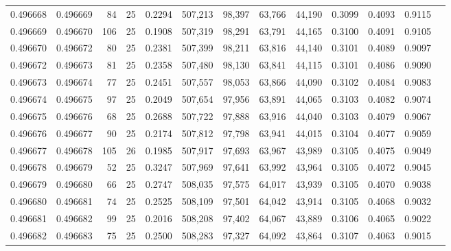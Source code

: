 \begin{tabular}{rrrrrrrrrrrrr}
0.496668 & 0.496669 &    84 &  25 &                                     0.2294 & 507,213 &  98,397 &  63,766 &  44,190 & 0.3099 & 0.4093 & 0.9115 \\
0.496669 & 0.496670 &   106 &  25 &                                     0.1908 & 507,319 &  98,291 &  63,791 &  44,165 & 0.3100 & 0.4091 & 0.9105 \\
0.496670 & 0.496672 &    80 &  25 &                                     0.2381 & 507,399 &  98,211 &  63,816 &  44,140 & 0.3101 & 0.4089 & 0.9097 \\
0.496672 & 0.496673 &    81 &  25 &                                     0.2358 & 507,480 &  98,130 &  63,841 &  44,115 & 0.3101 & 0.4086 & 0.9090 \\
0.496673 & 0.496674 &    77 &  25 &                                     0.2451 & 507,557 &  98,053 &  63,866 &  44,090 & 0.3102 & 0.4084 & 0.9083 \\
0.496674 & 0.496675 &    97 &  25 &                                     0.2049 & 507,654 &  97,956 &  63,891 &  44,065 & 0.3103 & 0.4082 & 0.9074 \\
0.496675 & 0.496676 &    68 &  25 &                                     0.2688 & 507,722 &  97,888 &  63,916 &  44,040 & 0.3103 & 0.4079 & 0.9067 \\
0.496676 & 0.496677 &    90 &  25 &                                     0.2174 & 507,812 &  97,798 &  63,941 &  44,015 & 0.3104 & 0.4077 & 0.9059 \\
0.496677 & 0.496678 &   105 &  26 &                                     0.1985 & 507,917 &  97,693 &  63,967 &  43,989 & 0.3105 & 0.4075 & 0.9049 \\
0.496678 & 0.496679 &    52 &  25 &                                     0.3247 & 507,969 &  97,641 &  63,992 &  43,964 & 0.3105 & 0.4072 & 0.9045 \\
0.496679 & 0.496680 &    66 &  25 &                                     0.2747 & 508,035 &  97,575 &  64,017 &  43,939 & 0.3105 & 0.4070 & 0.9038 \\
0.496680 & 0.496681 &    74 &  25 &                                     0.2525 & 508,109 &  97,501 &  64,042 &  43,914 & 0.3105 & 0.4068 & 0.9032 \\
0.496681 & 0.496682 &    99 &  25 &                                     0.2016 & 508,208 &  97,402 &  64,067 &  43,889 & 0.3106 & 0.4065 & 0.9022 \\
0.496682 & 0.496683 &    75 &  25 &                                     0.2500 & 508,283 &  97,327 &  64,092 &  43,864 & 0.3107 & 0.4063 & 0.9015 \\

\end{tabular}
